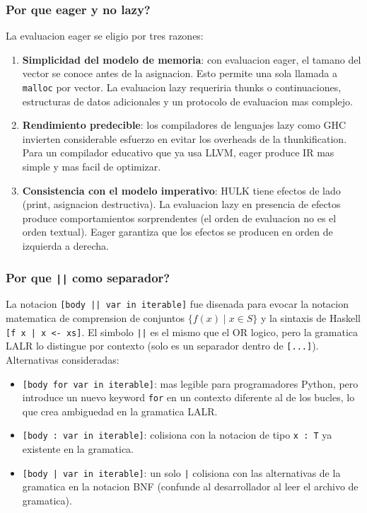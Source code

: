 \documentclass[12pt,a4paper]{article}
\begin{document}
\subsubsection{Por que eager y no lazy?}

La evaluacion eager se eligio por tres razones:

\begin{enumerate}
  \item \textbf{Simplicidad del modelo de memoria}: con evaluacion eager, el tamano
    del vector se conoce antes de la asignacion. Esto permite una sola llamada a
    \texttt{malloc} por vector. La evaluacion lazy requeriria thunks o continuaciones,
    estructuras de datos adicionales y un protocolo de evaluacion mas complejo.
  \item \textbf{Rendimiento predecible}: los compiladores de lenguajes lazy como GHC
    invierten considerable esfuerzo en evitar los overheads de la thunkification.
    Para un compilador educativo que ya usa LLVM, eager produce IR mas simple y
    mas facil de optimizar.
  \item \textbf{Consistencia con el modelo imperativo}: HULK tiene efectos de lado
    (print, asignacion destructiva). La evaluacion lazy en presencia de efectos produce
    comportamientos sorprendentes (el orden de evaluacion no es el orden textual).
    Eager garantiza que los efectos se producen en orden de izquierda a derecha.
\end{enumerate}

\subsubsection{Por que \texttt{||} como separador?}

La notacion \texttt{[body || var in iterable]} fue disenada para evocar la notacion
matematica de comprension de conjuntos $\{f(x) \mid x \in S\}$ y la sintaxis de
Haskell \texttt{[f x | x <- xs]}. El simbolo \texttt{||} es el mismo que el OR logico,
pero la gramatica LALR lo distingue por contexto (solo es un separador dentro de
\texttt{[...]}). Alternativas consideradas:

\begin{itemize}
  \item \texttt{[body for var in iterable]}: mas legible para programadores Python,
    pero introduce un nuevo keyword \texttt{for} en un contexto diferente al de los
    bucles, lo que crea ambiguedad en la gramatica LALR.
  \item \texttt{[body : var in iterable]}: colisiona con la notacion de tipo
    \texttt{x : T} ya existente en la gramatica.
  \item \texttt{[body | var in iterable]}: un solo \texttt{|} colisiona con las
    alternativas de la gramatica en la notacion BNF (confunde al desarrollador al
    leer el archivo de gramatica).
\end{itemize}
\end{document}
